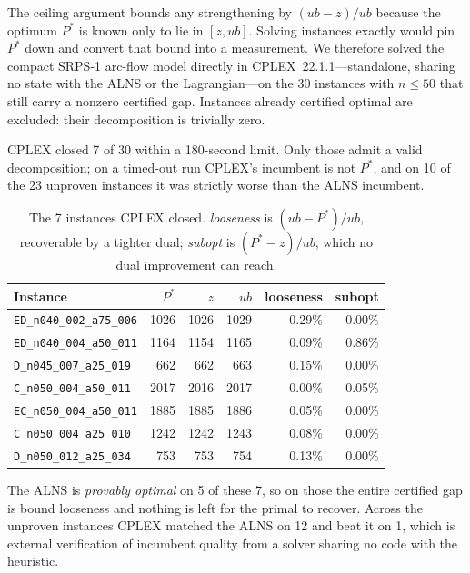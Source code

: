 The ceiling argument bounds any strengthening by $(ub-z)/ub$ because the optimum $P^\ast$ is known only to lie in $[z,ub]$. Solving instances exactly would pin $P^\ast$ down and convert that bound into a measurement. We therefore solved the compact SRPS-1 arc-flow model directly in CPLEX~22.1.1---standalone, sharing no state with the ALNS or the Lagrangian---on the 30 instances with $n\le 50$ that still carry a nonzero certified gap. Instances already certified optimal are excluded: their decomposition is trivially zero.

CPLEX closed 7 of 30 within a 180-second limit. Only those admit a valid decomposition; on a timed-out run CPLEX's incumbent is not $P^\ast$, and on 10 of the 23 unproven instances it was strictly worse than the ALNS incumbent.

\begin{table}[htbp]
\centering
\caption{The 7 instances CPLEX closed. \emph{looseness} is $(ub-P^\ast)/ub$, recoverable by a tighter dual; \emph{subopt} is $(P^\ast-z)/ub$, which no dual improvement can reach.}
\label{tab:exact}
\begin{tabular}{lrrrrr}
\toprule
Instance & $P^\ast$ & $z$ & $ub$ & looseness & subopt \\
\midrule
\texttt{ED\_n040\_002\_a75\_006} & 1026 & 1026 & 1029 & 0.29\% & 0.00\% \\
\texttt{ED\_n040\_004\_a50\_011} & 1164 & 1154 & 1165 & 0.09\% & 0.86\% \\
\texttt{D\_n045\_007\_a25\_019} & 662 & 662 & 663 & 0.15\% & 0.00\% \\
\texttt{C\_n050\_004\_a50\_011} & 2017 & 2016 & 2017 & 0.00\% & 0.05\% \\
\texttt{EC\_n050\_004\_a50\_011} & 1885 & 1885 & 1886 & 0.05\% & 0.00\% \\
\texttt{C\_n050\_004\_a25\_010} & 1242 & 1242 & 1243 & 0.08\% & 0.00\% \\
\texttt{D\_n050\_012\_a25\_034} & 753 & 753 & 754 & 0.13\% & 0.00\% \\
\bottomrule
\end{tabular}
\end{table}

The ALNS is \emph{provably optimal} on 5 of these 7, so on those the entire certified gap is bound looseness and nothing is left for the primal to recover. Across the unproven instances CPLEX matched the ALNS on 12 and beat it on 1, which is external verification of incumbent quality from a solver sharing no code with the heuristic.


